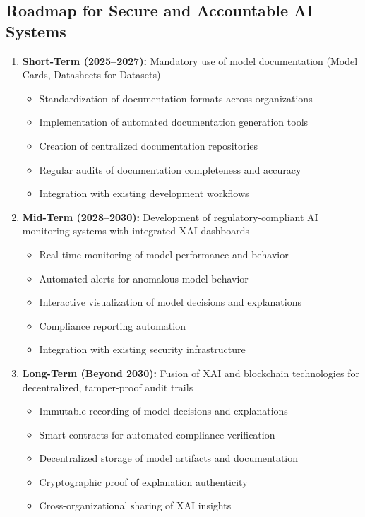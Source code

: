 \documentclass[12pt]{article}
\begin{document}
\subsection{Roadmap for Secure and Accountable AI Systems}
\begin{enumerate}[noitemsep]
  \item \textbf{Short-Term (2025–2027):} Mandatory use of model documentation (Model Cards, Datasheets for Datasets)
    \begin{itemize}
      \item Standardization of documentation formats across organizations
      \item Implementation of automated documentation generation tools
      \item Creation of centralized documentation repositories
      \item Regular audits of documentation completeness and accuracy
      \item Integration with existing development workflows
    \end{itemize}
    
  \item \textbf{Mid-Term (2028–2030):} Development of regulatory-compliant AI monitoring systems with integrated XAI dashboards
    \begin{itemize}
      \item Real-time monitoring of model performance and behavior
      \item Automated alerts for anomalous model behavior
      \item Interactive visualization of model decisions and explanations
      \item Compliance reporting automation
      \item Integration with existing security infrastructure
    \end{itemize}
    
  \item \textbf{Long-Term (Beyond 2030):} Fusion of XAI and blockchain technologies for decentralized, tamper-proof audit trails
    \begin{itemize}
      \item Immutable recording of model decisions and explanations
      \item Smart contracts for automated compliance verification
      \item Decentralized storage of model artifacts and documentation
      \item Cryptographic proof of explanation authenticity
      \item Cross-organizational sharing of XAI insights
    \end{itemize}
\end{enumerate}
\end{document}

